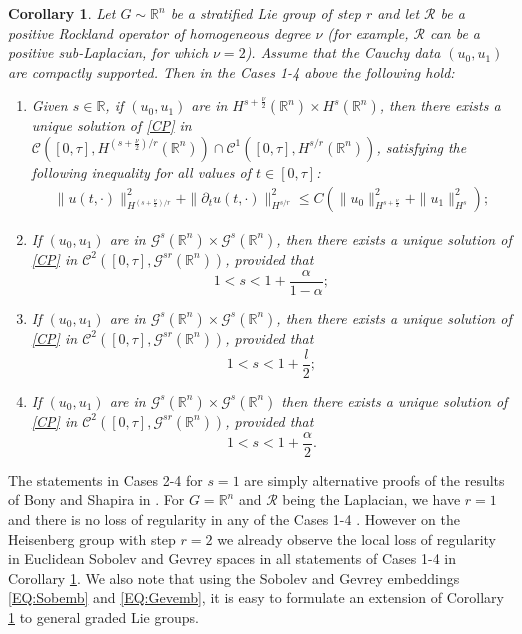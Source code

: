 \documentclass[12pt,oneside,a4paper]{book}
\numberwithin{equation}{section}     %
\theoremstyle{plain}
\newtheorem{corollary}[theorem]{Corollary}
\theoremstyle{definition}
\newcommand{\R}{{\mathbb R}}
\newcommand{\Rn}{{\R}^n}
\begin{document}
\begin{corollary}\label{COR:main}
	Let $G\sim \Rn$ be a stratified Lie group of step $r$ and let $\mathcal R$ be a positive Rockland operator of homogeneous degree $\nu$ (for example, $\mathcal R$ can be a positive sub-Laplacian, for which $\nu=2$). 
	Assume that the Cauchy data $(u_0,u_1)$ are compactly supported.
	Then in the Cases 1-4 above the following hold:
	\begin{enumerate}
		\item Given $s\in\R$, if $(u_0,u_1)$ are  in  $H^{s+\frac{\nu}{2}}(\Rn)\times H^s(\Rn)$, then there exists a unique solution of \eqref{CP} in $\mathcal C([0,\tau],H^{(s+\frac{\nu}{2})/r}(\Rn))\cap\mathcal C^1([0,\tau],H^{s/r}(\Rn))$, satisfying the following inequality for all values of $t\in [0,\tau]$:
		\begin{align*}
		\|u(t,\cdot)\|^2_{H^{(s+\frac{\nu}{2})/r}}+\|\partial_t u(t,\cdot)\|^2_{H^{s/r}}\leq C(\|u_0\|^2_{H^{s+\frac{\nu}{2}}}+\|u_1\|^2_{H^{s}});
		\end{align*}
		
		\item If $(u_0, u_1)$ are in $\mathcal G^s(\Rn)\times \mathcal G^s(\Rn)$, then there exists a unique solution of \eqref{CP} in $\mathcal C^2([0,\tau],\mathcal G^{sr}(\Rn))$, provided that
		\[
		1< s <1 +\frac{\alpha}{1-\alpha};
		\]
		
		\item If $(u_0, u_1)$ are in $\mathcal G^s(\Rn)\times \mathcal G^s(\Rn)$, then there exists a unique solution of \eqref{CP} in $\mathcal C^2([0,\tau],\mathcal G^{sr}(\Rn))$, provided that
		\[
		1< s <1 +\frac{l}{2};
		\]
		
		\item If $(u_0, u_1)$ are in $\mathcal G^s(\Rn)\times \mathcal G^s(\Rn)$ then there exists a unique solution of \eqref{CP} in $\mathcal C^2([0,\tau],\mathcal G^{sr}(\Rn))$, provided that
		\[
		1< s <1 +\frac{\alpha}{2}. 
		\]
	\end{enumerate}
\end{corollary}
The statements in Cases 2-4 for $s=1$ are simply alternative proofs of the results of Bony and Shapira in \cite{Bony-Schapira:analytic-IM-1972}.
For $G=\Rn$ and $\mathcal R$ being the Laplacian, we have $r=1$ and there is no loss of regularity in any of the Cases 1-4
\cite{CDS79,CK2002,GR2012,GR2013,KS2006}.
However on the Heisenberg group with step $r=2$ we already observe the local loss of regularity in Euclidean Sobolev and Gevrey spaces in all statements of Cases 1-4 in Corollary \ref{COR:main}.
We also note that using the Sobolev and Gevrey embeddings \eqref{EQ:Sobemb} and \eqref{EQ:Gevemb}, it is easy to formulate an extension of Corollary \ref{COR:main} to general graded Lie groups.
\end{document}
